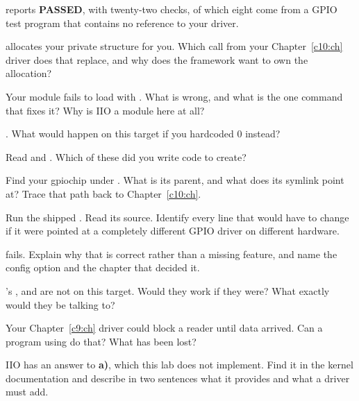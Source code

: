 \checkyourself {} reports \textbf{PASSED}, with twenty-two checks, of which
eight come from a GPIO test program that contains no reference to your driver.

  allocates your private structure for you. Which call from
your Chapter~\ref{c10:ch} driver does that replace, and why does the framework want to own the
allocation?

 Your module fails to load with . What is wrong, and
what is the one command that fixes it? Why is IIO a module here at all?

 . What would happen on this target if you hardcoded 0 instead?

\label{c11:ex:7}

 Read  and . Which of
these did you write code to create?

 Find your gpiochip under . What is its parent, and what does
its  symlink point at? Trace that path back to Chapter~\ref{c10:ch}.

 Run the shipped . Read its source. Identify every line that would have
to change if it were pointed at a completely different GPIO driver on different hardware.

  fails. Explain why that is correct rather than a missing
feature, and name the config option and the chapter that decided it.

 's ,  and  are not on this
target. Would they work if they were? What exactly would they be talking to?

\label{c11:ex:8}

 Your Chapter~\ref{c9:ch} driver could block a reader until data arrived. Can a program
using  do that? What has been lost?

 IIO has an answer to \textbf{a)}, which this lab does not implement. Find it in the kernel
documentation and describe in two sentences what it provides and what a driver must add.

